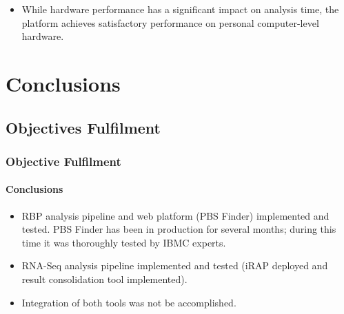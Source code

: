 \documentclass[xcolor=dvipsnames]{beamer}
\begin{document}
\begin{frame}[allowframebreaks]
\begin{itemize}
\item
While hardware performance has a significant impact on analysis time, the
platform achieves satisfactory performance on personal computer-level hardware.
\end{itemize}




\end{frame}


\section{Conclusions}
\subsection{Objectives Fulfilment}
\begin{frame}
  \frametitle{Objective Fulfilment}
  \framesubtitle{Conclusions}

\begin{itemize}
\item
RBP analysis pipeline and web platform (PBS Finder) implemented and tested. PBS
Finder has been in production for several months; during this time it was
thoroughly tested by IBMC experts.\\ \vspace{0.8cm}

\item
RNA-Seq analysis pipeline implemented and tested (iRAP deployed and result
consolidation tool implemented).\\ \vspace{0.8cm}

\item
Integration of both tools was not be accomplished.
\end{itemize}


\end{frame}
\end{document}
